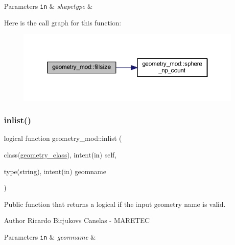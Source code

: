 \begin{DoxyParams}[1]{Parameters}
\mbox{\tt in}  & {\em shapetype} & \\
\hline
\end{DoxyParams}
Here is the call graph for this function\+:\nopagebreak
\begin{figure}[H]
\begin{center}
\leavevmode
\includegraphics[width=346pt]{namespacegeometry__mod_a92602e1198d3607613ea2722fb002685_cgraph}
\end{center}
\end{figure}
\mbox{\label{namespacegeometry__mod_a22dd77024fce56da299445a697256155}} 
\subsubsection{\texorpdfstring{inlist()}{inlist()}}
{\footnotesize\ttfamily logical function geometry\+\_\+mod\+::inlist (\begin{DoxyParamCaption}\item[{class(\hyperlink{structgeometry__mod_1_1geometry__class}{geometry\+\_\+class}), intent(in)}]{self,  }\item[{type(string), intent(in)}]{geomname }\end{DoxyParamCaption})\hspace{0.3cm}{\ttfamily [private]}}



Public function that returns a logical if the input geometry name is valid. 

\begin{DoxyAuthor}{Author}
Ricardo Birjukovs Canelas -\/ M\+A\+R\+E\+T\+EC 
\end{DoxyAuthor}

\begin{DoxyParams}[1]{Parameters}
\mbox{\tt in}  & {\em geomname} & \\
\hline
\end{DoxyParams}
\mbox{\label{namespacegeometry__mod_abcb09c0f5274c27cb79b0dd009ed94b3}} 
